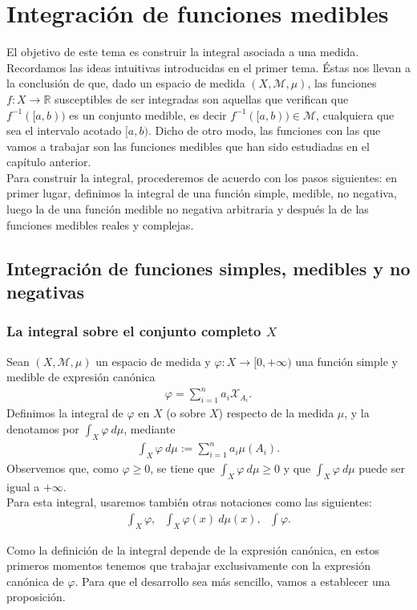 \chapter{Integración de funciones medibles}

El objetivo de este tema es construir la integral asociada a una medida. Recordamos las ideas intuitivas introducidas en el primer tema. Éstas nos llevan a la conclusión de que, dado un espacio de medida $(X, \mathcal{M}, \mu)$, las funciones $f: X \longrightarrow \mathbb{R}$ susceptibles de ser integradas son aquellas que verifican que $f^{-1}([a, b))$ es un conjunto medible, es decir $f^{-1}([a, b)) \in \mathcal{M}$, cualquiera que sea el intervalo acotado $[a, b)$. Dicho de otro modo, las funciones con las que vamos a trabajar son las funciones medibles que han sido estudiadas en el capítulo anterior.
\\
\newline
Para construir la integral, procederemos de acuerdo con los pasos siguientes: en primer lugar, definimos la integral de una función simple, medible, no negativa, luego la de una función medible no negativa arbitraria y después la de las funciones medibles reales y complejas. 

\section{Integración de funciones simples, medibles y no negativas}

\subsection{La integral sobre el conjunto completo $X$}

\begin{defi}
Sean $(X, \mathcal{M}, \mu)$ un espacio de medida y $\varphi: X \longrightarrow [0, +\infty)$ una función simple y medible de expresión canónica
\begin{align*}
    \varphi = \sum_{i=1}^{n}{a_i \mathcal{X}_{A_i}}.
\end{align*}
Definimos la integral de $\varphi$ en $X$ (o sobre $X$) respecto de la medida $\mu$, y la denotamos por $\int_{X}{\varphi} \ d\mu$, mediante
\begin{align*}
    \int_{X}{\varphi \ d\mu} := \sum_{i=1}^{n}{a_i\mu(A_i)}.
\end{align*}
Observemos que, como $\varphi \ge 0$, se tiene que $\int_{X}{\varphi} \ d\mu \ge 0$ y que $\int_{X}{\varphi} \ d\mu$ puede ser igual a $+\infty$. 
\\
\newline
Para esta integral, usaremos también otras notaciones como las siguientes:
\begin{align*}
    \int_{X}{\varphi}, \ \ \ \int_{X}{\varphi(x) \ d\mu(x)}, \ \ \ \int{\varphi}.
\end{align*}
\end{defi}
Como la definición de la integral depende de la expresión canónica, en estos primeros momentos tenemos que trabajar exclusivamente con la expresión canónica de $\varphi$. Para que el desarrollo sea más sencillo, vamos a establecer una proposición.

